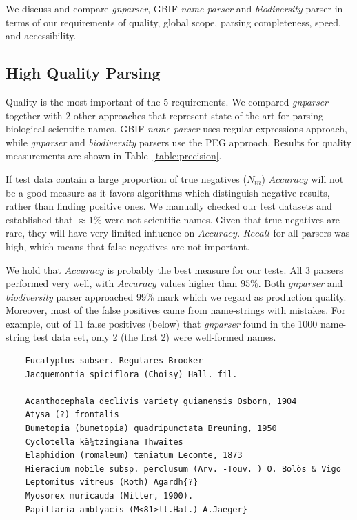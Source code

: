\documentclass{bmcart}
\makeatletter
\newcommand{\verbatimfont}[1]{\def\verbatim@font{#1}}%
\makeatother
\begin{document}
We discuss and compare \textit{gnparser}, GBIF \textit{name-parser} and
\textit{biodiversity} parser in terms of our requirements of
quality, global scope, parsing completeness, speed, and accessibility.


\subsection*{High Quality Parsing}

Quality is the most important of the 5 requirements. We
compared \textit{gnparser} together with 2 other approaches that
represent state of the art for parsing biological scientific names. GBIF
\textit{name-parser} uses regular expressions approach, while \textit{gnparser}
and \textit{biodiversity} parsers use the PEG approach. Results for quality
measurements are shown in Table~\ref{table:precision}.

If test data contain a large proportion of true negatives ($N_{tn}$) $Accuracy$
will not be a good measure as it favors algorithms which distinguish negative
results, rather than finding positive ones. We manually checked our test
datasets and established that $\approx1\%$ were not scientific names. Given
that true negatives are rare, they will have very limited influence on
$Accuracy$. $Recall$ for all parsers was high, which means that false negatives
are not important.

We hold that $Accuracy$ is probably the best measure for our tests. All 3
parsers performed very well, with $Accuracy$ values higher than $95\%$. Both
\textit{gnparser} and \textit{biodiversity} parser approached 99\% mark which
we regard as production quality. Moreover, most of the false positives came
from name-strings with mistakes. For example, out of 11 false positives (below)
that \textit{gnparser} found in the 1000 name-string test data set, only 2 (the
first 2) were well-formed names.

\vspace{0.5cm}

\verbatimfont{\bfseries\rmfamily\small}

\begin{verbatim}
    Eucalyptus subser. Regulares Brooker
    Jacquemontia spiciflora (Choisy) Hall. fil.

    Acanthocephala declivis variety guianensis Osborn, 1904
    Atysa (?) frontalis
    Bumetopia (bumetopia) quadripunctata Breuning, 1950
    Cyclotella kã¼tzingiana Thwaites
    Elaphidion (romaleum) tæniatum Leconte, 1873
    Hieracium nobile subsp. perclusum (Arv. -Touv. ) O. Bolòs & Vigo
    Leptomitus vitreus (Roth) Agardh{?}
    Myosorex muricauda (Miller, 1900).
    Papillaria amblyacis (M<81>ll.Hal.) A.Jaeger}
\end{verbatim}
\end{document}
